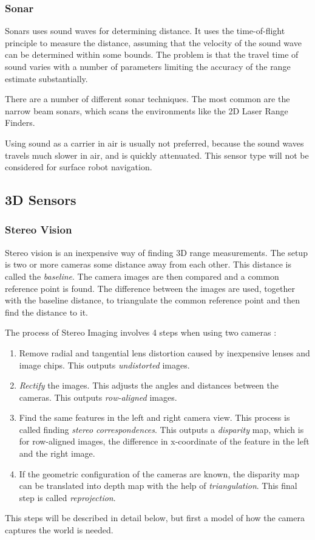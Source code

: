 \subsubsection{Sonar}
Sonars uses sound waves for determining distance. It uses the time-of-flight principle
to measure the distance, assuming that the velocity of the sound wave can be determined
within some bounds. The problem is that the travel time of sound varies with a
number of parameters limiting the accuracy of the range estimate substantially. 

There are a number of different sonar techniques. The most common are the narrow beam
sonars, which scans the environments like the 2D Laser Range Finders. \cite{mathisen}

Using sound as a carrier in air is usually not preferred, because the sound waves travels
much slower in air, and is quickly attenuated. This sensor type will not be considered for
surface robot navigation.


\subsection{3D Sensors}

\subsubsection{Stereo Vision}
Stereo vision is an inexpensive way of finding 3D range measurements. The setup is two or
more cameras some distance away from each other. This distance is called the
\emph{baseline}. The camera images are then compared and a common reference point is
found. The difference between the images are used, together with the baseline distance,
to triangulate the common reference point and then find the distance to it. 

The process of Stereo Imaging involves 4 steps when using two cameras \cite{openCV}:
\begin{enumerate}
    \item Remove radial and tangential lens distortion caused by inexpensive lenses and
        image chips. This outputs \emph{undistorted} images. 
    \item \emph{Rectify} the images. This adjusts the angles and distances between the cameras.
        This outputs \emph{row-aligned} images.
    \item Find the same features in the left and right camera view. This process is called
        finding \emph{stereo correspondences}. This outputs a \emph{disparity} map, which
        is for row-aligned images, the difference in x-coordinate of the feature in the left and the right image. 
    \item If the geometric configuration of the cameras are known, the disparity map can
        be translated into depth map with the help of \emph{triangulation}. This final
        step is called \emph{reprojection}.
\end{enumerate}
This steps will be described in detail below, but first a model of how the camera captures
the world is needed. 


